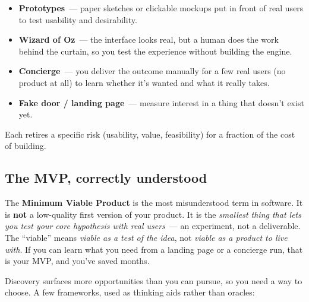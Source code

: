 \begin{itemize}
\tightlist
\item
  \textbf{Prototypes}~--- paper sketches or clickable mockups put in front of real users to test usability
  and desirability.
\item
  \textbf{Wizard of Oz}~--- the interface looks real, but a human does the work behind the curtain, so you
  test the experience without building the engine.
\item
  \textbf{Concierge}~--- you deliver the outcome manually for a few real users (no product at all) to learn
  whether it's wanted and what it really takes.
\item
  \textbf{Fake door / landing page}~--- measure interest in a thing that doesn't exist yet.
\end{itemize}

\noindent{}Each retires a specific risk (usability, value, feasibility) for a fraction of the cost of building.

\subsection*{The MVP, correctly understood}\label{product-discovery:the-mvp-correctly-understood}

The \textbf{Minimum Viable Product} is the most misunderstood term in software. It is \textbf{not} a
low-quality first version of your product. It is the \emph{smallest thing that lets you test your core
hypothesis with real users}~--- an experiment, not a deliverable. The ``viable'' means \emph{viable as a
test of the idea}, not \emph{viable as a product to live with}. If you can learn what you need from a
landing page or a concierge run, that is your MVP, and you've saved months.

\label{product-discovery:prioritization-deciding-what-to-pursue}

Discovery surfaces more opportunities than you can pursue, so you need a way to choose. A few
frameworks, used as thinking aids rather than oracles:

